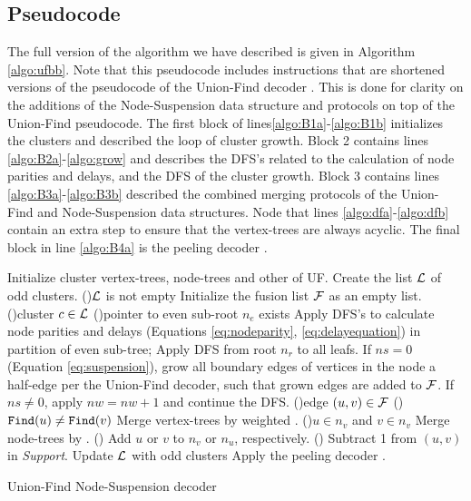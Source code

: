 \subsection{Pseudocode}\label{sec:pseudocode}
\FloatBarrier
The full version of the algorithm we have described is given in Algorithm \ref{algo:ufbb}. Note that this pseudocode includes instructions that are shortened versions of the pseudocode of the Union-Find decoder \cite{delfosse2017almost}. This is done for clarity on the additions of the Node-Suspension data structure and protocols on top of the Union-Find pseudocode. The first block  of lines\ref{algo:B1a}-\ref{algo:B1b} initializes the clusters and described the loop of cluster growth. Block 2 contains lines \ref{algo:B2a}-\ref{algo:grow} and describes the DFS's related to the calculation of node parities and delays, and the DFS of the cluster growth. Block 3 contains lines \ref{algo:B3a}-\ref{algo:B3b} described the combined merging protocols of the Union-Find and Node-Suspension data structures. Node that lines \ref{algo:dfa}-\ref{algo:dfb} contain an extra step to ensure that the vertex-trees are always acyclic. The final block in line \ref{algo:B4a} is the peeling decoder \cite{delfosse2017linear}. 

\begin{algorithm}[htb]
    \BlankLine
    \BlankLine
    Initialize cluster vertex-trees, node-trees and other of UF.\;\label{algo:B1a}
    Create the list $\mathcal{L}$ of odd clusters.\;
    \While(){$\mathcal{L}$ is not empty}{
      Initialize the fusion list $\mathcal{F}$ as an empty list.\;\label{algo:B1b}
      \For(){cluster $c\in\mathcal{L}$ \label{algo:B2a}}{
        \If(){pointer to even sub-root $n_e$ exists}{
          Apply DFS's to calculate node parities and delays (Equations \eqref{eq:nodeparity}, \eqref{eq:delayequation}) in partition of even sub-tree;\label{algo:pdc}
        }
        Apply DFS from root $n_r$ to all leafs. If $ns=0$ (Equation \eqref{eq:suspension}), grow all boundary edges of vertices in the node a half-edge per the Union-Find decoder, such that grown edges are added to $\mathcal{F}$. If $ns\neq0$, apply $nw=nw+1$ and continue the DFS.\;\label{algo:grow}
      }
      \For(){edge $(u,v) \in \mathcal{F}$\label{algo:B3a}}{
        \eIf(){$\texttt{Find}(u)\neq\texttt{Find}(v)$}{
          Merge vertex-trees by weighted .\;
          \eIf(){$u \in n_v$ and $v \in n_v$\label{algo:joina}}{
            Merge node-trees by .\;
          }(){
            Add $u$ or $v$ to $n_v$ or $n_u$, respectively.\;\label{algo:joinb}
          }
        }(\label{algo:dfa}){
          Subtract 1 from $(u,v)$ in \emph{Support}.\;\label{algo:dfb}
        }
      }
      Update $\mathcal{L}$ with odd clusters\; \label{algo:B3b}
    }
    Apply the peeling decoder \cite{delfosse2017linear}.\label{algo:B4a}
    \caption{Union-Find Node-Suspension decoder}\label{algo:ufbb}
  \end{algorithm}
    